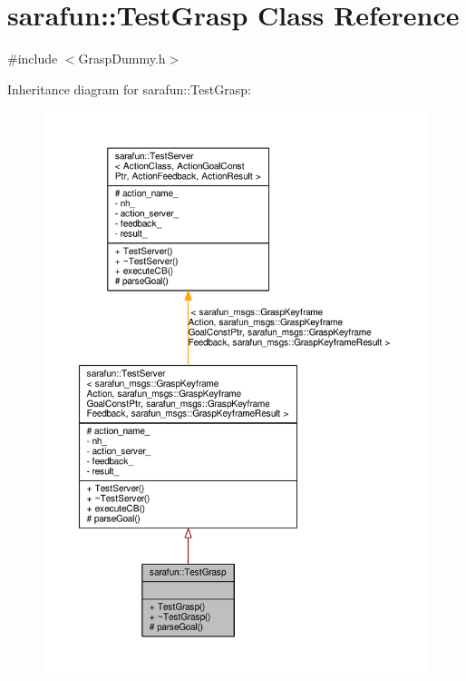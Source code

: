 \hypertarget{classsarafun_1_1TestGrasp}{\section{sarafun\-:\-:Test\-Grasp Class Reference}
\label{classsarafun_1_1TestGrasp}
}


{\ttfamily \#include $<$Grasp\-Dummy.\-h$>$}



Inheritance diagram for sarafun\-:\-:Test\-Grasp\-:\nopagebreak
\begin{figure}[H]
\begin{center}
\leavevmode
\includegraphics[width=350pt]{da/d2a/classsarafun_1_1TestGrasp__inherit__graph}
\end{center}
\end{figure}


